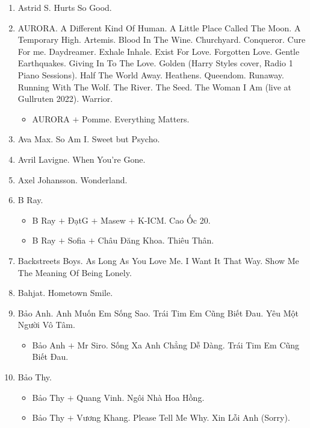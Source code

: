 \documentclass{article}
\begin{document}
\begin{enumerate}
\begin{quotation}
		I see it, I like it, I want it, I got it (yeah)\hfill$\square$
	\end{quotation}
	\begin{itemize}
		\item {\sc Ariana Grande $+$ The Weeknd.} Love Me Harder.
	\end{itemize}
	\item {\sc Astrid S.} Hurts So Good.
	\item {\sc AURORA.} A Different Kind Of Human. A Little Place Called The Moon. A Temporary High. Artemis. Blood In The Wine. Churchyard. Conqueror. Cure For me. Daydreamer. Exhale Inhale. Exist For Love. Forgotten Love. Gentle Earthquakes. Giving In To The Love. Golden (Harry Styles  cover, Radio 1 Piano Sessions). Half The World Away. Heathens. Queendom. Runaway. Running With The Wolf. The River. The Seed. The Woman I Am (live at Gullruten 2022). Warrior.
	\begin{itemize}
		\item {\sc AURORA $+$ Pomme.} Everything Matters.
	\end{itemize}
	\item {\sc Ava Max.} So Am I. Sweet but Psycho.
	\item {\sc Avril Lavigne.} When You're Gone.
	\item {\sc Axel Johansson.} Wonderland.
	\item {\sc B Ray.}
	\begin{itemize}
		\item {\sc B Ray $+$ ĐạtG $+$ Masew $+$ K-ICM.} Cao Ốc 20.
		\item {\sc B Ray $+$ Sofia $+$ Châu Đăng Khoa.} Thiêu Thân.
	\end{itemize}
	\item {\sc Backstreets Boys.} As Long As You Love Me. I Want It That Way. Show Me The Meaning Of Being Lonely.
	\item {\sc Bahjat.} Hometown Smile.
	\item {\sc Bảo Anh.} Anh Muốn Em Sống Sao. Trái Tim Em Cũng Biết Đau. Yêu Một Người Vô Tâm.
	\begin{itemize}
		\item {\sc Bảo Anh $+$ Mr Siro.} Sống Xa Anh Chẳng Dễ Dàng. Trái Tim Em Cũng Biết Đau.
	\end{itemize}
	\item {\sc Bảo Thy.}
	\begin{itemize}
		\item {\sc Bảo Thy $+$ Quang Vinh.} Ngôi Nhà Hoa Hồng.
		\item {\sc Bảo Thy $+$ Vương Khang.} Please Tell Me Why. Xin Lỗi Anh (Sorry).

\end{itemize}
\end{enumerate}
\end{document}
